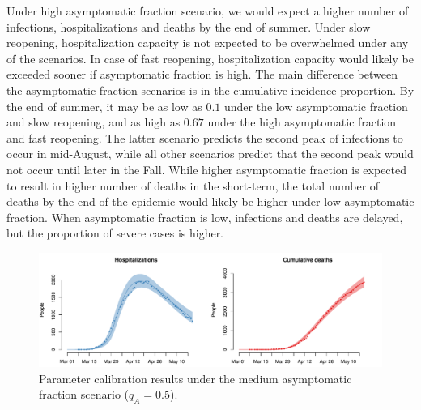\documentclass[11pt]{article}
\begin{document}
Under high asymptomatic fraction scenario, we would expect a higher number of infections, hospitalizations and deaths by the end of summer. 
Under slow reopening, hospitalization capacity is not expected to be overwhelmed under any of the scenarios. 
In case of fast reopening, hospitalization capacity would likely be exceeded sooner if asymptomatic fraction is high. 
The main difference between the asymptomatic fraction scenarios is in the cumulative incidence proportion. By the end of summer, it may be as low as $0.1$ under the low asymptomatic fraction and slow reopening, and as high as $0.67$ under the high asymptomatic fraction and fast reopening. The latter scenario predicts the second peak of infections to occur in mid-August, while all other scenarios predict that the second peak would not occur until later in the Fall. 
While higher asymptomatic fraction is expected to result in higher number of deaths in the short-term, the total number of deaths by the end of the epidemic would likely be higher under low asymptomatic fraction. When asymptomatic fraction is low, infections and deaths are delayed, but the proportion of severe cases is higher. 


\begin{figure} %
	\centering
	\includegraphics[width=.8\textwidth]{figures/calibration.pdf}
	\caption{Parameter calibration results under the medium asymptomatic fraction scenario ($q_A = 0.5$).}
	\label{fig:fit}
\end{figure}
\end{document}
